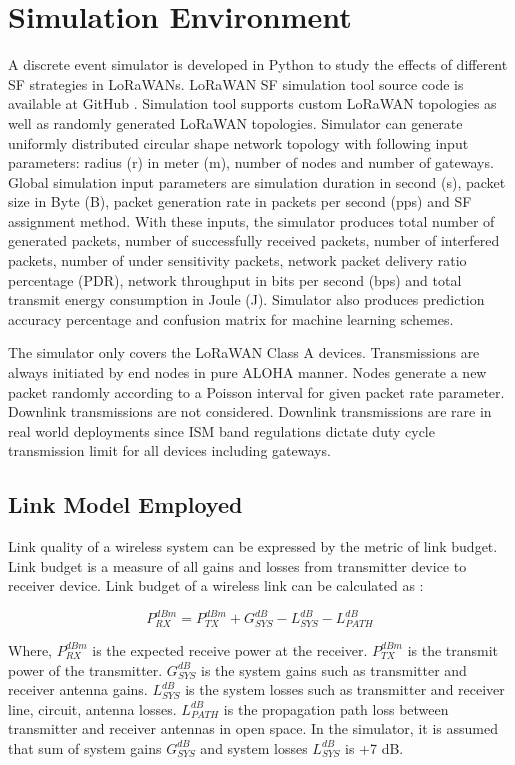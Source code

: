 \documentclass[conference]{IEEEtran}
\begin{document}
\section{Simulation Environment} \label{Simulation Environment}
A discrete event simulator is developed in Python to study the effects of different SF strategies in LoRaWANs. LoRaWAN SF simulation tool source code is available at GitHub \cite{tugrul_yatagan_2019_2579366}. Simulation tool supports custom LoRaWAN topologies as well as randomly generated LoRaWAN topologies. Simulator can generate uniformly distributed circular shape network topology with following input parameters: radius (r) in meter (m), number of nodes and number of gateways. Global simulation input parameters are simulation duration in second (s), packet size in Byte (B), packet generation rate in packets per second (pps) and SF assignment method. With these inputs, the simulator produces total number of generated packets, number of successfully received packets, number of interfered packets, number of under sensitivity packets, network packet delivery ratio percentage (PDR), network throughput in bits per second (bps) and total transmit energy consumption in Joule (J). Simulator also produces prediction accuracy percentage and confusion matrix for machine learning schemes.

The simulator only covers the LoRaWAN Class A devices. Transmissions are always initiated by end nodes in pure ALOHA manner. Nodes generate a new packet randomly according to a Poisson interval for given packet rate parameter. Downlink transmissions are not considered. Downlink transmissions are rare in real world deployments since ISM band regulations dictate duty cycle transmission limit for all devices including gateways.

\subsection{Link Model Employed}
Link quality of a wireless system can be expressed by the metric of link budget. Link budget is a measure of all gains and losses from transmitter device to receiver device. Link budget of a wireless link can be calculated as \cite{AN1200.22}:

\begin{equation} \label{eq:expected_rx_power}
P^{dBm}_{RX} = P^{dBm}_{TX} + G^{dB}_{SYS} - L^{dB}_{SYS} - L^{dB}_{PATH}
\end{equation}

Where, $P^{dBm}_{RX}$ is the expected receive power at the receiver. $P^{dBm}_{TX}$ is the transmit power of the transmitter. $G^{dB}_{SYS}$ is the system gains such as transmitter and receiver antenna gains. $L^{dB}_{SYS}$ is the system losses such as transmitter and receiver line, circuit, antenna losses. $L^{dB}_{PATH}$ is the propagation path loss between transmitter and receiver antennas in open space. In the simulator, it is assumed that sum of system gains $G^{dB}_{SYS}$ and system losses $L^{dB}_{SYS}$ is +7 dB.
\end{document}
